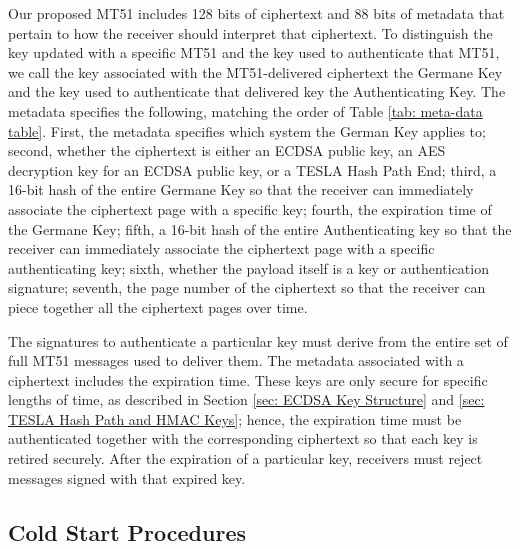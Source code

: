 \documentclass[letterpaper,times]{IONconf/IONconf}
\begin{document}
Our proposed MT51 includes 128 bits of ciphertext and 88 bits of metadata that pertain to how the receiver should interpret that ciphertext.
To distinguish the key updated with a specific MT51 and the key used to authenticate that MT51, we call the key associated with the MT51-delivered ciphertext the Germane Key and the key used to authenticate that delivered key the Authenticating Key.
The metadata specifies the following, matching the order of Table \ref{tab: meta-data table}.
First, the metadata specifies which system the German Key applies to;
second, whether the ciphertext is either an ECDSA public key, an AES decryption key for an ECDSA public key, or a TESLA Hash Path End;
third, a 16-bit hash of the entire Germane Key so that the receiver can immediately associate the ciphertext page with a specific key;
fourth, the expiration time of the Germane Key;
fifth, a 16-bit hash of the entire Authenticating key so that the receiver can immediately associate the ciphertext page with a specific authenticating key;
sixth, whether the payload itself is a key or authentication signature;
seventh, the page number of the ciphertext so that the receiver can piece together all the ciphertext pages over time.

The signatures to authenticate a particular key must derive from the entire set of full MT51 messages used to deliver them.
The metadata associated with a ciphertext includes the expiration time.
These keys are only secure for specific lengths of time, as described in Section \ref{sec: ECDSA Key Structure} and \ref{sec: TESLA Hash Path and HMAC Keys}; hence, the expiration time must be authenticated together with the corresponding ciphertext so that each key is retired securely.
After the expiration of a particular key, receivers must reject messages signed with that expired key.

\subsection{Cold Start Procedures}
\end{document}
